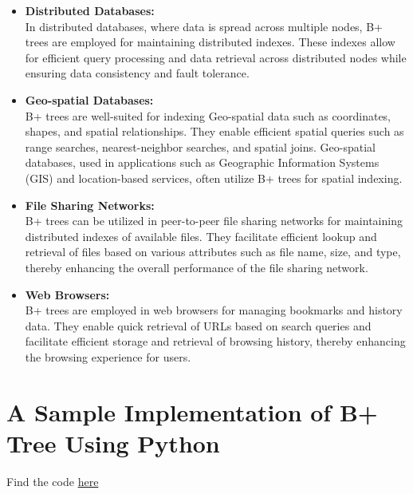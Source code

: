 \documentclass{article}
\begin{document}
    \begin{itemize}
        \item \textbf{Distributed Databases:}\\In distributed databases, where data is spread across multiple nodes, B+ trees are employed for maintaining distributed indexes. These indexes allow for efficient query processing and data retrieval across distributed nodes while ensuring data consistency and fault tolerance.
    \end{itemize}

    \begin{itemize}
        \item \textbf{Geo-spatial Databases:}\\B+ trees are well-suited for indexing Geo-spatial data such as coordinates, shapes, and spatial relationships. They enable efficient spatial queries such as range searches, nearest-neighbor searches, and spatial joins. Geo-spatial databases, used in applications such as Geographic Information Systems (GIS) and location-based services, often utilize B+ trees for spatial indexing.
    \end{itemize}

    \begin{itemize}
        \item \textbf{File Sharing Networks:}\\B+ trees can be utilized in peer-to-peer file sharing networks for maintaining distributed indexes of available files. They facilitate efficient lookup and retrieval of files based on various attributes such as file name, size, and type, thereby enhancing the overall performance of the file sharing network.
    \end{itemize}



    \begin{itemize}
        \item \textbf{Web Browsers:}\\B+ trees are employed in web browsers for managing bookmarks and history data. They enable quick retrieval of URLs based on search queries and facilitate efficient storage and retrieval of browsing history, thereby enhancing the browsing experience for users.
    \end{itemize}
    \section{A Sample Implementation of B+ Tree Using Python} 
    
    Find the code \href{https://www.programiz.com/dsa/deletion-from-a-b-plus-tree}{here}\\ \\
\end{document}
